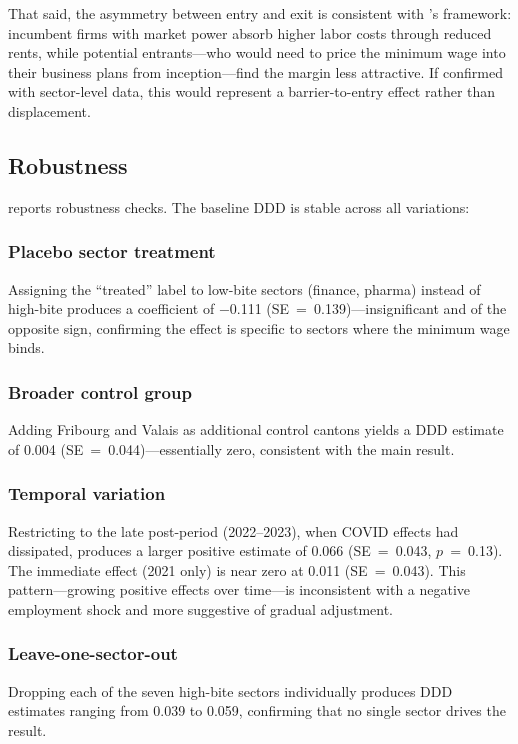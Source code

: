 \documentclass[12pt]{article}
\begin{document}
That said, the asymmetry between entry and exit is consistent with \citet{azar2022}'s framework: incumbent firms with market power absorb higher labor costs through reduced rents, while potential entrants---who would need to price the minimum wage into their business plans from inception---find the margin less attractive. If confirmed with sector-level data, this would represent a barrier-to-entry effect rather than displacement.

\subsection{Robustness}



 reports robustness checks. The baseline DDD is stable across all variations:

\subsubsection*{Placebo sector treatment} Assigning the ``treated'' label to low-bite sectors (finance, pharma) instead of high-bite produces a coefficient of $-$0.111 (SE~=~0.139)---insignificant and of the opposite sign, confirming the effect is specific to sectors where the minimum wage binds.

\subsubsection*{Broader control group} Adding Fribourg and Valais as additional control cantons yields a DDD estimate of 0.004 (SE~=~0.044)---essentially zero, consistent with the main result.

\subsubsection*{Temporal variation} Restricting to the late post-period (2022--2023), when COVID effects had dissipated, produces a larger positive estimate of 0.066 (SE~=~0.043, $p$~=~0.13). The immediate effect (2021 only) is near zero at 0.011 (SE~=~0.043). This pattern---growing positive effects over time---is inconsistent with a negative employment shock and more suggestive of gradual adjustment.

\subsubsection*{Leave-one-sector-out} Dropping each of the seven high-bite sectors individually produces DDD estimates ranging from 0.039 to 0.059, confirming that no single sector drives the result.
\end{document}
